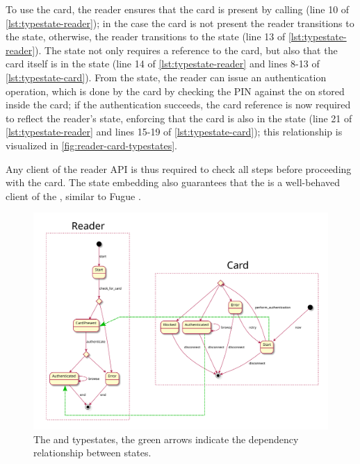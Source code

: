 To use the card, the reader ensures that the card is present by calling 
(line 10 of \autoref{lst:typestate-reader});
in the case the card is not present the reader transitions to the  state,
otherwise, the reader transitions to the  state (line 13 of \autoref{lst:typestate-reader}).
The  state not only requires a reference to the card,
but also that the card itself is in the  state (line 14 of \autoref{lst:typestate-reader}
and lines 8-13 of \autoref{lst:typestate-card}).
From the  state, the reader can issue an authentication operation,
which is done by the card by checking the PIN against the on stored inside the card;
if the authentication succeeds, the card reference is now required to reflect the reader's state,
enforcing that the card is also in the  state
(line 21 of \autoref{lst:typestate-reader} and lines 15-19 of \autoref{lst:typestate-card});
this relationship is visualized in \autoref{fig:reader-card-typestates}.

Any client of the reader API is thus required to check all steps before proceeding with the card.
The state embedding also guarantees that the  is a well-behaved client of the ,
similar to Fugue \autocite{DeLine2004}.

\begin{figure}
    \centering
    \includegraphics[width=\linewidth]{Chapters/Figures/C5/reader_typestates.pdf}
    \caption{The  and  typestates, the green arrows indicate the dependency relationship between states.}
    \label{fig:reader-card-typestates}
\end{figure}

